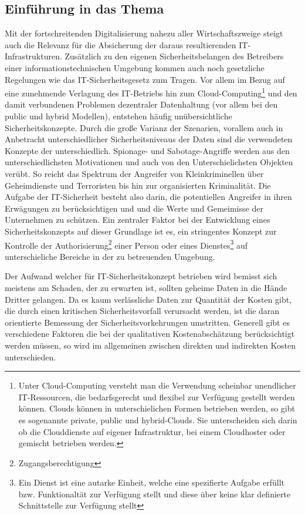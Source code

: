 \documentclass[
a4paper,   
titlepage,  
halfparskip,
12pt        
]{scrartcl}
\begin{document}
\begin{onehalfspacing}
\subsection{Einführung in das Thema}
\label{subsec:einführung}
Mit der fortschreitenden Digitalisierung nahezu aller Wirtschaftszweige steigt auch die Relevanz für die Absicherung der daraus resultierenden \ac{IT}-Infrastrukturen.
Zusätzlich zu den eigenen Sicherheitsbelangen des Betreibers einer informationstechnischen Umgebung kommen auch noch gesetzliche Regelungen wie das IT-Sicherheitsgesetz zum Tragen. 
Vor allem im Bezug auf eine zunehmende Verlagung des \ac{IT}-Betriebs hin zum Cloud-Computing\footnote{Unter Cloud-Computing versteht man die Verwendung scheinbar  unendlicher  
IT-Ressourcen,  die bedarfsgerecht und flexibel zur Verfügung gestellt werden können. Clouds können in unterschielichen Formen betrieben werden, so gibt es sogenannte private, public und hybrid-Clouds. Sie unterscheiden sich darin ob die Clouddienste auf eigener Infrastruktur, bei einem Cloudhoster oder gemischt betrieben werden.\cite[S. 3]{cloud}} und den damit verbundenen Problemen dezentraler Datenhaltung (vor allem bei den public und hybrid Modellen), entstehen häufig unübersichtliche Sicherheitskonzepte. Durch die große Varianz der Szenarien, vorallem auch in Anbetracht unterschiedlicher Sicherheitsniveaus der Daten sind die verwendeten Konzepte der unterschiedlich.\cite[S. 7f]{risiko}\newline
Spionage- und Sabotage-Angriffe werden aus den unterschiedlichsten Motivationen und auch von den Unterschielichsten Objekten verübt. So reicht das Spektrum der Angreifer von Kleinkriminellen über Geheimdienste und Terroristen bis hin zur organisierten Kriminalität. Die Aufgabe der \ac{IT}-Sicherheit besteht also darin, die potentiellen Angreifer in ihren Erwägungen zu berücksichtigen und und die Werte und Gemeimisse der Unternehmen zu schützen. Ein zentraler Faktor bei der Entwicklung eines Sicherheitskonzepts auf dieser Grundlage ist es, ein stringentes Konzept zur Kontrolle der Authorisierung\footnote{Zugangsberechtigung} einer Person oder eines Dienstes\footnote{Ein Dienst ist eine autarke Einheit, welche eine spezifierte Aufgabe erfüllt bzw. Funktionaltät zur Verfügung stellt und diese über keine klar definierte Schnittstelle zur Verfügung stellt} auf unterschieliche Bereiche in der zu betreuenden Umgebung. 

Der Aufwand welcher für \ac{IT}-Sicherheitskonzept betrieben wird bemisst sich meistens am Schaden, der zu erwarten ist, sollten geheime Daten in die Hände Dritter gelangen. Da es kaum verlässliche Daten zur Quantität der Kosten gibt, die durch einen kritischen Sicherheitsvorfall verursacht werden, ist die daran orientierte Bemessung der Sicherheitsvorkehrungen umstritten. Generell gibt es verschiedene Faktoren die bei der qualitativen Kostenabschätzung berücksichtigt werden müssen, so wird im allgemeinen zwischen direkten und indirekten Kosten unterschieden.\cite[S. 12]{kosten}

\end{onehalfspacing}
\end{document}
